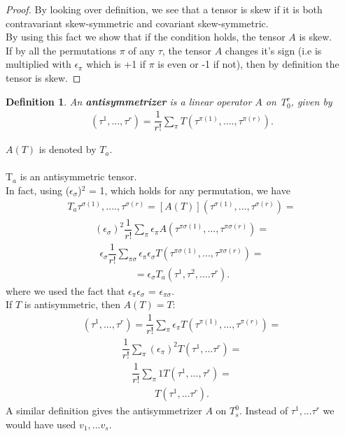 \documentclass[12pt,a4paper]{article}
\newtheorem{defn}[thm]{Definition}
\begin{document}
\begin{proof}
By looking over definition, we see that a tensor is skew if it is both contravariant skew-symmetric and covariant skew-symmetric. \\
By using this fact we show that if the condition holds, the tensor $A$ is skew.\\
If by all the permutations $\pi$ of any $\tau$, the tensor $A$ changes it's sign (i.e is multiplied with $\epsilon_\pi$ which is +1 if $\pi$ is even or -1 if not), then by definition the tensor is skew.
\end{proof}
\begin{defn}
An \textbf{antisymmetrizer} is a linear operator $A$ on T$^r_0$, given by 
\begin{align*}
[A(T)](\tau^1,...,\tau^r) = \dfrac{1}{r!}\sum_{\pi}T(\tau^{\pi(1)},....,\tau^{\pi(r)}).
\end{align*}
\end{defn}
$A(T)$ is denoted by $T$$_a$.\\\\
\hspace{1cm} T$_a$ is an antisymmetric tensor. \\In fact, using ($\epsilon_\sigma$)$^2$ = 1, which holds for any permutation, we have\\
\begin{align*}
T_a \tau^{\sigma(1)},....,\tau^{\sigma(r)} = [A(T)](\tau^{\sigma(1)},...,\tau^{\sigma(r)})=
\end{align*}
\begin{align*}
(\epsilon_\sigma)^2 \dfrac{1}{r!} \sum_{\pi} \epsilon_\pi A(\tau^{\pi\sigma(1)},...,\tau^{\pi\sigma(r)}) =
\end{align*}
\begin{align*}
\epsilon_\sigma \dfrac{1}{r!} \sum_{\pi\sigma} \epsilon_\pi \epsilon_\sigma T(\tau^{\pi\sigma(1)},...,\tau^{\pi\sigma(r)})=
\end{align*}
\begin{align*}
=\epsilon_\sigma T_a(\tau^1,\tau^2,....\tau^r).
\end{align*}
where we used the fact that $\epsilon_\pi \epsilon_\sigma$ = $\epsilon_{\pi\sigma}$. \\
\hspace{1cm} If $T$ is antisymmetric, then $A(T) = T:$\\
\begin{align*}
[A(T)](\tau^1,...,\tau^r) = \dfrac{1}{r!}\sum_{\pi}\epsilon_\pi T(\tau^{\pi(1)},...,\tau^{\pi(r)})=
\end{align*}
\begin{align*}
\dfrac{1}{r!}\sum_{\pi}(\epsilon_\pi)^2 T(\tau^1,...\tau^r) =
\end{align*}
\begin{align*}
\dfrac{1}{r!} \sum_{\pi} 1 T(\tau^1,...,\tau^r) =
\end{align*}
\begin{align*}
 T(\tau^1,...\tau^r).
\end{align*}
\hspace{1cm} A similar definition gives the antisymmetrizer $A$ on $T_s^0$. Instead of $\tau^1,...\tau^r$ we would have used $v_1,...v_s$.
\end{document}
